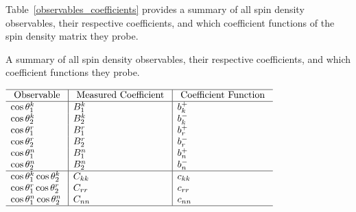 Table~\ref{observables_coefficients} provides a summary of all spin density observables, their respective coefficients, and which coefficient functions of the spin density matrix they probe.
\begin{table}[htb]
\caption{A summary of all spin density observables, their respective coefficients, and which coefficient functions they probe. 
        }
\vspace*{6pt}
\begin{center}
\begin{adjustbox}{scale=0.85,center}
\begin{math}
\begin{array}{l|l|l}
\hline \text { Observable } & \text { Measured Coefficient } & \text { Coefficient Function } \\
\hline 
\cos \theta_1^k & B_1^k & b_k^{+} \\
\cos \theta_2^k & B_2^k & b_k^{-} \\
\cos \theta_1^r & B_1^r & b_r^{+} \\
\cos \theta_2^r & B_2^r & b_r^{-} \\
\cos \theta_1^n & B_1^n & b_n^{+} \\
\cos \theta_2^n & B_2^n & b_n^{-} \\
\hline 
\cos \theta_1^k \cos \theta_2^k & C_{k k} & c_{k k} \\
\cos \theta_1^r \cos \theta_2^r & C_{r r} & c_{r r} \\
\cos \theta_1^n \cos \theta_2^n & C_{n n} & c_{n n} \\
\hline 

\end{array}
\end{math}
\end{adjustbox}
\end{center}
\end{table}
